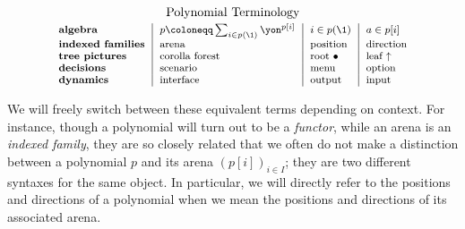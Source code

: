 \begin{equation}%
    \footnotesize
    \begin{tabular}{l|l|l|l}
        \multicolumn{4}{c}{\normalsize Polynomial Terminology}\\[3pt]
        \textbf{algebra} & $p \coloneqq \sum_{i \in p(\1)} \yon^{p[i]}$ & $i \in p(\1)$ & $a \in p[i]$ \\
        \textbf{indexed families} & arena & position & direction \\
        \textbf{tree pictures} & corolla forest & root $\bullet$ & leaf $\uparrow$ \\
        \textbf{decisions} & scenario & menu & option \\
        \textbf{dynamics} & interface & output & input
    \end{tabular}
\end{equation}

We will freely switch between these equivalent terms depending on context.
For instance, though a polynomial will turn out to be a \emph{functor}, while an arena is an \emph{indexed family}, they are so closely related that we often do not make a distinction between a polynomial $p$ and its arena $(p[i])_{i \in I}$; they are two different syntaxes for the same object.
In particular, we will directly refer to the positions and directions of a polynomial when we mean the positions and directions of its associated arena.

